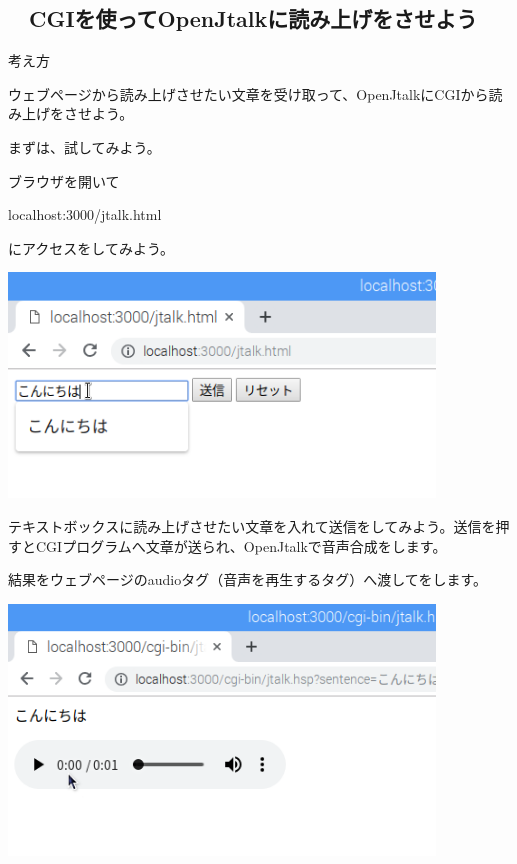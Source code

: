
\clearpage\subsection*{\theExercise　CGIを使ってOpenJtalkに読み上げをさせよう}
\addtocounter{Exercise}{-1}\label{E:Jtalk}

考え方

ウェブページから読み上げさせたい文章を受け取って、OpenJtalkにCGIから読み上げをさせよう。

まずは、試してみよう。

ブラウザを開いて

localhost:3000/jtalk.html

にアクセスをしてみよう。

%


\centering
\includegraphics[width=0.85\textwidth]{text07-img/ome7-img056.png}
\flushleft

テキストボックスに読み上げさせたい文章を入れて送信をしてみよう。送信を押すとCGIプログラムへ文章が送られ、OpenJtalkで音声合成をします。


\bigskip

結果をウェブページのaudioタグ（音声を再生するタグ）へ渡してをします。

%
%


\centering
\includegraphics[width=0.85\textwidth]{text07-img/ome7-img057.png}
\flushleft

